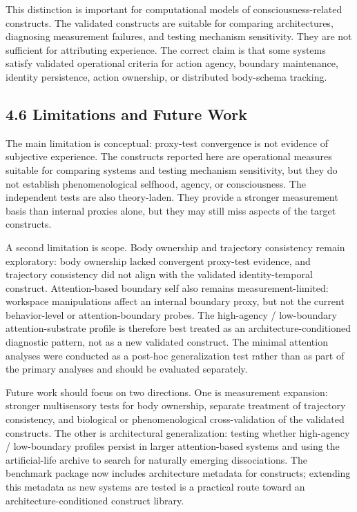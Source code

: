 \documentclass[
  11pt,
  letterpaper,
]{article}
\begin{document}
This distinction is important for computational models of
consciousness-related constructs. The validated constructs are suitable
for comparing architectures, diagnosing measurement failures, and
testing mechanism sensitivity. They are not sufficient for attributing
experience. The correct claim is that some systems satisfy validated
operational criteria for action agency, boundary maintenance, identity
persistence, action ownership, or distributed body-schema tracking.

\subsection{4.6 Limitations and Future
Work}\label{limitations-and-future-work}

The main limitation is conceptual: proxy-test convergence is not
evidence of subjective experience. The constructs reported here are
operational measures suitable for comparing systems and testing
mechanism sensitivity, but they do not establish phenomenological
selfhood, agency, or consciousness. The independent tests are also
theory-laden. They provide a stronger measurement basis than internal
proxies alone, but they may still miss aspects of the target constructs.

A second limitation is scope. Body ownership and trajectory consistency
remain exploratory: body ownership lacked convergent proxy-test
evidence, and trajectory consistency did not align with the validated
identity-temporal construct. Attention-based boundary self also remains
measurement-limited: workspace manipulations affect an internal boundary
proxy, but not the current behavior-level or attention-boundary probes.
The high-agency / low-boundary attention-substrate profile is therefore
best treated as an architecture-conditioned diagnostic pattern, not as a
new validated construct. The minimal attention analyses were conducted
as a post-hoc generalization test rather than as part of the primary
analyses and should be evaluated separately.

Future work should focus on two directions. One is measurement
expansion: stronger multisensory tests for body ownership, separate
treatment of trajectory consistency, and biological or phenomenological
cross-validation of the validated constructs. The other is architectural
generalization: testing whether high-agency / low-boundary profiles
persist in larger attention-based systems and using the artificial-life
archive to search for naturally emerging dissociations. The benchmark
package now includes architecture metadata for constructs; extending
this metadata as new systems are tested is a practical route toward an
architecture-conditioned construct library.
\end{document}
